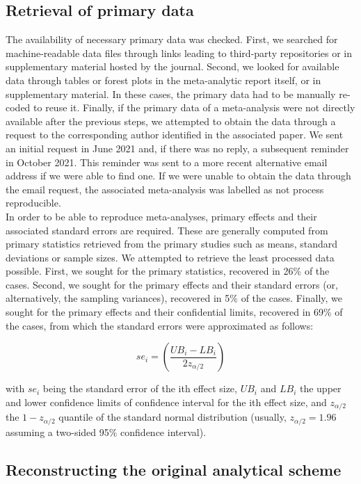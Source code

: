\documentclass[
  ,jou, a4paper,floatsintext]{apa6}
\begin{document}
\hypertarget{retrieval-of-primary-data}{%
\subsection{Retrieval of primary data}\label{retrieval-of-primary-data}}

The availability of necessary primary data was checked. First, we searched for machine-readable data files through links leading to third-party repositories or in supplementary material hosted by the journal. Second, we looked for available data through tables or forest plots in the meta-analytic report itself, or in supplementary material. In these cases, the primary data had to be manually re-coded to reuse it. Finally, if the primary data of a meta-analysis were not directly available after the previous steps, we attempted to obtain the data through a request to the corresponding author identified in the associated paper. We sent an initial request in June 2021 and, if there was no reply, a subsequent reminder in October 2021. This reminder was sent to a more recent alternative email address if we were able to find one. If we were unable to obtain the data through the email request, the associated meta-analysis was labelled as not process reproducible.\\
In order to be able to reproduce meta-analyses, primary effects and their associated standard errors are required. These are generally computed from primary statistics retrieved from the primary studies such as means, standard deviations or sample sizes. We attempted to retrieve the least processed data possible. First, we sought for the primary statistics, recovered in 26\% of the cases. Second, we sought for the primary effects and their standard errors (or, alternatively, the sampling variances), recovered in 5\% of the cases. Finally, we sought for the primary effects and their confidential limits, recovered in 69\% of the cases, from which the standard errors were approximated as follows:

\[se_i = (\frac{UB_i - LB_i}{2z_{\alpha/2}})\]

with \(se_i\) being the standard error of the ith effect size, \(UB_i\) and \(LB_i\) the upper and lower confidence limits of confidence interval for the ith effect size, and \(z_{\alpha/2}\) the \(1 - z_{\alpha/2}\) quantile of the standard normal distribution (usually, \(z_{\alpha/2} = 1.96\) assuming a two-sided 95\% confidence interval).

\hypertarget{reconstructing-the-original-analytical-scheme}{%
\subsection{Reconstructing the original analytical scheme}\label{reconstructing-the-original-analytical-scheme}}
\end{document}
